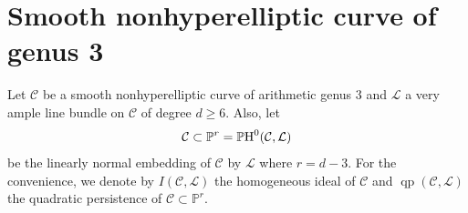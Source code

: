 \documentclass[11pt,letterpaper,reqno]{amsart}
\theoremstyle{plain}
\theoremstyle{definition}
\newtheorem{open problem}[theorem]{Open Problem}
\newtheorem{remark and notation}[theorem]{Remark and Notation}
\newtheorem{remark and definition}[theorem]{Remark and Definition}
\newtheorem{definition and notation}[theorem]{Definition and Notation}
\newtheorem{notation and convention}[theorem]{Notation and Convention}
\newtheorem{notation and remark}[theorem]{Notation and Remark}
\newtheorem{convention and notation}[theorem]{Convention and Notation}
\def \p {\mathbb{P}}
\def \l {\mathcal{L}}
\def \H {\textnormal{H}}
\def \qp {\operatorname{qp}}
\begin{document}
\bigskip

\section{Smooth nonhyperelliptic curve of genus 3}\label{sec:nonhyper}

Let $\mathcal{C}$ be a smooth nonhyperelliptic curve of arithmetic  genus $3$ and $\mathcal{L}$ a very ample line bundle on $\mathcal{C}$ of degree $d \geq 6$. Also, let
\begin{equation*}
\mathcal{C} \subset \p^{r}=\p\H^0(\mathcal{C},\l)
\end{equation*}
be the linearly normal embedding of $\mathcal{C}$ by $\mathcal{L}$ where $r=d-3$. For the convenience, we denote by $I(\mathcal{C},\mathcal{L})$ the homogeneous ideal of $\mathcal{C}$ and $\qp (\mathcal{C},\mathcal{L})$ the quadratic persistence of $\mathcal{C} \subset \p^{r}$.
\end{document}
